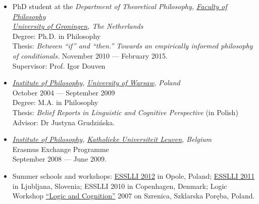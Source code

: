 \documentclass[a4paper,12pt]{article}
\begin{document}
\begin{small}
  
  \begin{itemize}
    \item PhD student at
    the %
    \emph{Department of Theoretical Philosophy, \href{http://www.rug.nl/filosofie/}{Faculty of Philosophy}\\
    \href{http://www.rug.nl}{University of Groningen}, The Netherlands}\\
    Degree: Ph.D. in Philosophy\\
    Thesis: \emph{Between ``if'' and ``then.'' Towards an empirically informed philosophy of conditionals.} 
    November 2010 --- February 2015.\\
    Supervisor: Prof. Igor Douven  
    
    \item \emph{\href{http://www.filozofia.uw.edu.pl}{Institute of Philosophy}, \href{http://www.uw.edu.pl}{University of Warsaw}, Poland}\\
    October 2004 --- September 2009\\
    Degree: M.A. in Philosophy\\
    Thesis: \emph{Belief Reports in Linguistic and Cognitive Perspective} (in Polish)\\
    Advisor: Dr Justyna Grudzińska.
    
    \item \emph{\href{http://hiw.kuleuven.be/eng/}{Institute of Philosophy}, \href{http://www.kuleuven.be}{Katholieke Universiteit Leuven}, Belgium}\\
    Erasmus Exchange Programme\\
    September 2008 --- June 2009.
  

    \item Summer schools and workshops:
    \href{http://www.esslli2012.pl}{ESSLLI 2012} in Opole, Poland;
    \href{http://esslli2011.ijs.si}{ESSLLI 2011} in Ljubljana, Slovenia;
    ESSLLI 2010 in Copenhagen, Denmark;
    Logic Workshop \href{http://www.logika.uw.edu.pl/warsztaty2007/index.html}{``Logic
      and Cognition''} 2007 on Szrenica, Szklarska Poręba, Poland.


\end{itemize}
\end{small}
\end{document}
